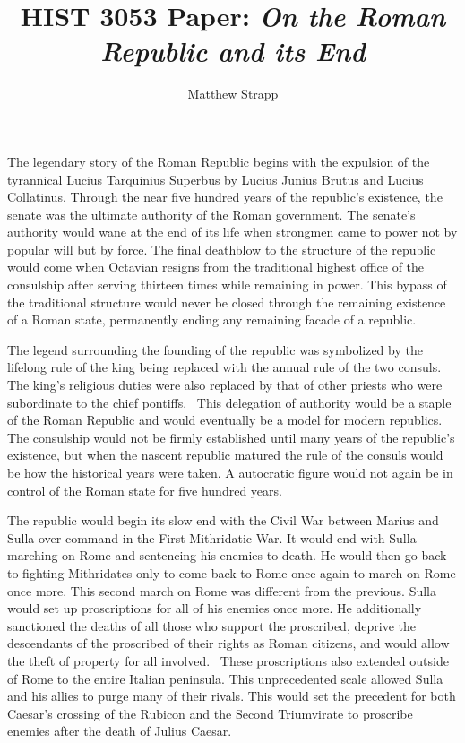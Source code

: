 \documentclass[12pt]{article}
\title{HIST 3053 Paper: \emph{On the Roman Republic and its End}}
\author{Matthew Strapp}
\begin{document}
    \begin{singlespace}
        \maketitle
    \end{singlespace}

    The legendary story of the Roman Republic begins with the expulsion of the tyrannical Lucius Tarquinius Superbus by Lucius Junius Brutus and Lucius Collatinus. Through the near five hundred years of the republic's existence, the senate was the ultimate authority of the Roman government. The senate's authority would wane at the end of its life when strongmen came to power not by popular will but by force. The final deathblow to the structure of the republic would come when Octavian resigns from the traditional highest office of the consulship after serving thirteen times while remaining in power. This bypass of the traditional structure would never be closed through the remaining existence of a Roman state, permanently ending any remaining facade of a republic.

    The legend surrounding the founding of the republic was symbolized by the lifelong rule of the king being replaced with the annual rule of the two consuls. The king's religious duties were also replaced by that of other priests who were subordinate to the chief pontiffs.~\autocite{LivyII} This delegation of authority would be a staple of the Roman Republic and would eventually be a model for modern republics. The consulship would not be firmly established until many years of the republic's existence, but when the nascent republic matured the rule of the consuls would be how the historical years were taken. A autocratic figure would not again be in control of the Roman state for five hundred years.

    The republic would begin its slow end with the Civil War between Marius and Sulla over command in the First Mithridatic War. It would end with Sulla marching on Rome and sentencing his enemies to death. He would then go back to fighting Mithridates only to come back to Rome once again to march on Rome once more. This second march on Rome was different from the previous. Sulla would set up proscriptions for all of his enemies once more. He additionally sanctioned the deaths of all those who support the proscribed, deprive the descendants of the proscribed of their rights as Roman citizens, and would allow the theft of property for all involved.~\autocite[31.4]{Plutarch-Sulla} These proscriptions also extended outside of Rome to the entire Italian peninsula. This unprecedented scale allowed Sulla and his allies to purge many of their rivals. This would set the precedent for both Caesar's crossing of the Rubicon and the Second Triumvirate to proscribe enemies after the death of Julius Caesar.
\end{document}
